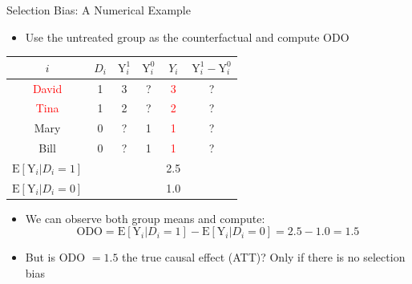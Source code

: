 \documentclass[hyperref={pdfpagelabels=false}]{beamer}
\begin{document}
\begin{frame}{Selection Bias: A Numerical Example}
	\begin{itemize}
		\item Use the untreated group as the counterfactual and compute ODO
	\end{itemize}
	\vspace{0.1cm}
	\begin{center}
		\begin{threeparttable}
			\centering\footnotesize
			\begin{tabular}{cccccc}
				\toprule
				$i$ & $D_i$ & $\mathrm{Y}^{1}_{i}$ & $\mathrm{Y}^{0}_{i}$ & $Y_i$ & $\mathrm{Y}^{1}_{i}-\mathrm{Y}^{0}_{i}$ \\
				\midrule
				\textcolor{red}{David} & 1 & 3 & ? & \textcolor{red}{3} & ? \\
				\textcolor{red}{Tina}  & 1 & 2 & ? & \textcolor{red}{2} & ? \\
				Mary  & 0 & ? & 1 & \textcolor{red}{1} & ? \\
				Bill  & 0 & ? & 1 & \textcolor{red}{1} & ? \\
				\midrule
				$\mathrm{E}[\mathrm{Y}_{i} | D_i=1]$ & & & & 2.5 & \\
				$\mathrm{E}[\mathrm{Y}_{i} | D_i=0]$ & & & & 1.0 & \\
				\bottomrule
			\end{tabular}
		\end{threeparttable}
	\end{center}
	\vspace{0.15cm}
	\begin{itemize}
		\item We can observe both group means and compute:
		\begin{equation*}
			\text{ODO} = \mathrm{E}[\mathrm{Y}_{i}|D_i=1] - \mathrm{E}[\mathrm{Y}_{i}|D_i=0] = 2.5 - 1.0 = 1.5
		\end{equation*}
		\item But is ODO $= 1.5$ the true causal effect (ATT)? Only if there is no selection bias
	\end{itemize}
\end{frame}
\end{document}

